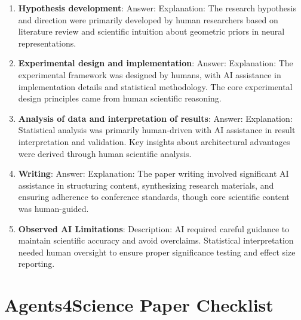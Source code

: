 \documentclass{article}
\begin{document}
\begin{enumerate}
    \item \textbf{Hypothesis development}: 
    Answer: \involvementA{}
    Explanation: The research hypothesis and direction were primarily developed by human researchers based on literature review and scientific intuition about geometric priors in neural representations.

    \item \textbf{Experimental design and implementation}: 
    Answer: \involvementB{}
    Explanation: The experimental framework was designed by humans, with AI assistance in implementation details and statistical methodology. The core experimental design principles came from human scientific reasoning.

    \item \textbf{Analysis of data and interpretation of results}: 
    Answer: \involvementB{}
    Explanation: Statistical analysis was primarily human-driven with AI assistance in result interpretation and validation. Key insights about architectural advantages were derived through human scientific analysis.

    \item \textbf{Writing}: 
    Answer: \involvementC{}
    Explanation: The paper writing involved significant AI assistance in structuring content, synthesizing research materials, and ensuring adherence to conference standards, though core scientific content was human-guided.

    \item \textbf{Observed AI Limitations}: 
    Description: AI required careful guidance to maintain scientific accuracy and avoid overclaims. Statistical interpretation needed human oversight to ensure proper significance testing and effect size reporting.
\end{enumerate}

\newpage

\section*{Agents4Science Paper Checklist}
\end{document}
